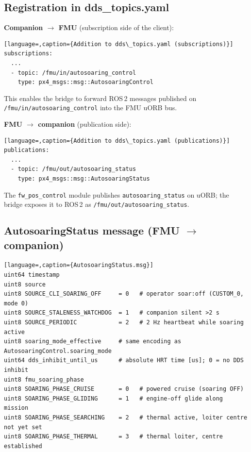 \documentclass[12pt,a4paper]{article}
\begin{document}
\subsection{Registration in dds\_topics.yaml}

\textbf{Companion $\rightarrow$ FMU} (subscription side of the client):

\begin{lstlisting}[language=,caption={Addition to dds\_topics.yaml (subscriptions)}]
subscriptions:
  ...
  - topic: /fmu/in/autosoaring_control
    type: px4_msgs::msg::AutosoaringControl
\end{lstlisting}

This enables the bridge to forward ROS\,2 messages published on
\texttt{/fmu/in/autosoaring\_control} into the FMU uORB bus.

\textbf{FMU $\rightarrow$ companion} (publication side):

\begin{lstlisting}[language=,caption={Addition to dds\_topics.yaml (publications)}]
publications:
  ...
  - topic: /fmu/out/autosoaring_status
    type: px4_msgs::msg::AutosoaringStatus
\end{lstlisting}

The \texttt{fw\_pos\_control} module publishes \texttt{autosoaring\_status} on
uORB; the bridge exposes it to ROS\,2 as \texttt{/fmu/out/autosoaring\_status}.

\subsection{AutosoaringStatus message (FMU $\rightarrow$ companion)}

\begin{lstlisting}[language=,caption={AutosoaringStatus.msg}]
uint64 timestamp
uint8 source
uint8 SOURCE_CLI_SOARING_OFF     = 0   # operator soar:off (CUSTOM_0, mode 0)
uint8 SOURCE_STALENESS_WATCHDOG  = 1   # companion silent >2 s
uint8 SOURCE_PERIODIC            = 2   # 2 Hz heartbeat while soaring active
uint8 soaring_mode_effective     # same encoding as AutosoaringControl.soaring_mode
uint64 dds_inhibit_until_us      # absolute HRT time [us]; 0 = no DDS inhibit
uint8 fmu_soaring_phase
uint8 SOARING_PHASE_CRUISE       = 0   # powered cruise (soaring OFF)
uint8 SOARING_PHASE_GLIDING      = 1   # engine-off glide along mission
uint8 SOARING_PHASE_SEARCHING    = 2   # thermal active, loiter centre not yet set
uint8 SOARING_PHASE_THERMAL      = 3   # thermal loiter, centre established
\end{lstlisting}
\end{document}

